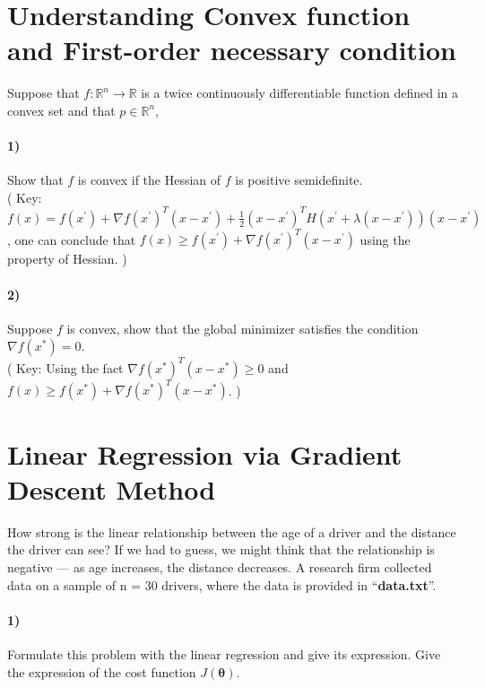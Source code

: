 \documentclass{article}
\begin{document}
\section{Understanding Convex function and First-order necessary condition} 

Suppose that $f: \mathbb{R}^n \rightarrow \mathbb{R}$ is a twice continuously differentiable function defined in a convex set and that $p \in \mathbb{R}^n$, 

\paragraph{1)} Show that $f$ is convex if the Hessian of $f$ is positive semidefinite. \\
( Key: $f(x) = f(x^{\prime}) + \nabla f(x^\prime)^T(x - x^{\prime}) + \frac{1}{2} (x - x^{\prime})^T H(x^{\prime} + \lambda(x-x^{\prime})) (x - x^{\prime})$, one can conclude that $f(x) \geq f(x^{\prime}) + \nabla f(x^\prime)^T(x - x^{\prime})$ using the property of Hessian. )

\paragraph{2)} Suppose $f$ is convex, show that the global minimizer satisfies the condition $\nabla f(x^*) = 0$. \\
( Key: Using the fact $\nabla f(x^*)^T(x-x^*) \geq 0$ and $f(x) \geq f(x^*) + \nabla f(x^*)^T(x - x^*)$. )




\section{Linear Regression via Gradient Descent Method}
\label{problem1}
How strong is the linear relationship between the age of a driver and the distance the driver can see? If we had to guess, we might think that the relationship is negative — as age increases, the distance decreases. A research firm collected data on a sample of n = 30 drivers, where the data is provided in ``\textbf{data.txt}''. 

\paragraph{1)} Formulate this problem with the linear regression and give its expression. Give the expression of the cost function $J(\bm \theta)$.
\end{document}
